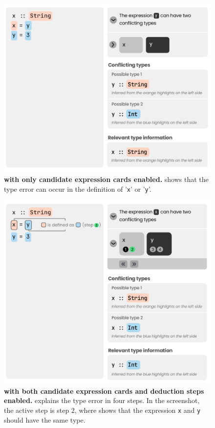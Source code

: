 \begin{figure}
    \centering
    \includegraphics[width=\linewidth]{images/intro-candidate.pdf}
    \caption{
        \textbf{\chameleon{} with only candidate expression cards enabled.}
        \chameleon{} shows that the type error can
        occur in the definition of '\texttt{x}' or '\texttt{y}'.
    }
    \label{fig:expression}
\end{figure}


\begin{figure}
    \centering
    \includegraphics[width=\linewidth]{images/intro-deduction.pdf}
    \caption{
        \textbf{\chameleon{} with both candidate expression cards and deduction steps
        enabled.}
        \chameleon{} explains the type error in four steps. In the screenshot, the active step is step 2, where \chameleon{} shows that the expression \texttt{x} and \texttt{y} should have the same type. 
    }
    \label{fig:deduction}
\end{figure}



